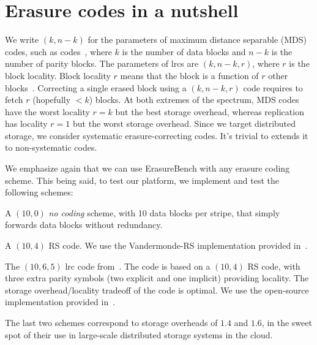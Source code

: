 \section{Erasure codes in a nutshell}
\label{sec:codes}

We write $(k,n-k)$ for the parameters of maximum distance separable (MDS) codes, such as  codes~\autocite{reed-solomon}, where $k$ is the number of data blocks and $n-k$ is the number of parity blocks. 
The parameters of \acp{lrc} are  $(k,n-k,r)$, where $r$ is the block locality. 
Block locality $r$ means that the block is a function of $r$ other blocks~\autocite{XorbasVLDB}. Correcting a single erased block using a $(k,n-k,r)$ code requires to fetch $r$ (hopefully $<k$) blocks. 
At both extremes of the spectrum, MDS codes have the worst locality $r=k$ but the best storage overhead, whereas replication has locality $r=1$ but the worst storage overhead. 
Since we target distributed storage, we consider systematic erasure-correcting codes.
It's trivial to extends it to non-systematic codes. %

We emphasize again that we can use ErasureBench with any erasure coding scheme. This being said, to test our platform, we implement and test the following schemes:
\begin{description}
\item[\textbf{NC}] A $(10,0)$ \emph{no coding} scheme, with 10 data blocks per stripe, that simply forwards data blocks without redundancy. %
\item[\textbf{\acs{rs}}] A $(10,4)$ RS code. We use the Vandermonde-RS implementation provided in~\autocite{XorbasVLDB}.  
\item[\textbf{\acs{lrc}}] The $(10,6,5)$ \acs{lrc} code from~\autocite{XorbasVLDB}. The code is based on a $(10,4)$ RS code, with three extra parity symbols (two explicit and one implicit) providing locality. The storage overhead/locality tradeoff of the code is optimal. We use the open-source implementation provided in~\autocite{XorbasVLDB}.
\end{description}
The last two schemes correspond to storage overheads of $1.4$ and $1.6$, in the sweet spot of their use in large-scale distributed storage systems in the cloud.
